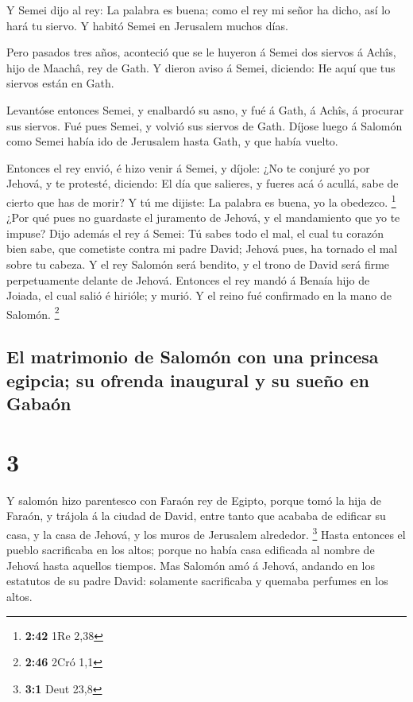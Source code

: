  Y Semei dijo al rey: La palabra es buena; como el rey mi
señor ha dicho, así lo hará tu siervo. Y habitó Semei en Jerusalem
muchos días.

 Pero pasados tres años, aconteció que se le huyeron á
Semei dos siervos á Achîs, hijo de Maachâ, rey de Gath. Y dieron aviso á
Semei, diciendo: He aquí que tus siervos están en Gath.

 Levantóse entonces Semei, y enalbardó su asno, y fué á
Gath, á Achîs, á procurar sus siervos. Fué pues Semei, y volvió sus
siervos de Gath.  Díjose luego á Salomón como Semei había
ido de Jerusalem hasta Gath, y que había vuelto.

 Entonces el rey envió, é hizo venir á Semei, y díjole: ¿No
te conjuré yo por Jehová, y te protesté, diciendo: El día que salieres,
y fueres acá ó acullá, sabe de cierto que has de morir? Y tú me dijiste:
La palabra es buena, yo la obedezco. \footnote{\textbf{2:42} 1Re 2,38}
 ¿Por qué pues no guardaste el juramento de Jehová, y el
mandamiento que yo te impuse?  Dijo además el rey á Semei:
Tú sabes todo el mal, el cual tu corazón bien sabe, que cometiste contra
mi padre David; Jehová pues, ha tornado el mal sobre tu cabeza.
 Y el rey Salomón será bendito, y el trono de David será
firme perpetuamente delante de Jehová.  Entonces el rey
mandó á Benaía hijo de Joiada, el cual salió é hirióle; y murió. Y el
reino fué confirmado en la mano de Salomón. \footnote{\textbf{2:46} 2Cró
  1,1}

\hypertarget{el-matrimonio-de-salomuxf3n-con-una-princesa-egipcia-su-ofrenda-inaugural-y-su-sueuxf1o-en-gabauxf3n}{%
\subsection{El matrimonio de Salomón con una princesa egipcia; su
ofrenda inaugural y su sueño en
Gabaón}\label{el-matrimonio-de-salomuxf3n-con-una-princesa-egipcia-su-ofrenda-inaugural-y-su-sueuxf1o-en-gabauxf3n}}

\hypertarget{section-2}{%
\section{3}\label{section-2}}

 Y salomón hizo parentesco con Faraón rey de Egipto, porque
tomó la hija de Faraón, y trájola á la ciudad de David, entre tanto que
acababa de edificar su casa, y la casa de Jehová, y los muros de
Jerusalem alrededor. \footnote{\textbf{3:1} Deut 23,8} 
Hasta entonces el pueblo sacrificaba en los altos; porque no había casa
edificada al nombre de Jehová hasta aquellos tiempos.  Mas
Salomón amó á Jehová, andando en los estatutos de su padre David:
solamente sacrificaba y quemaba perfumes en los altos.

